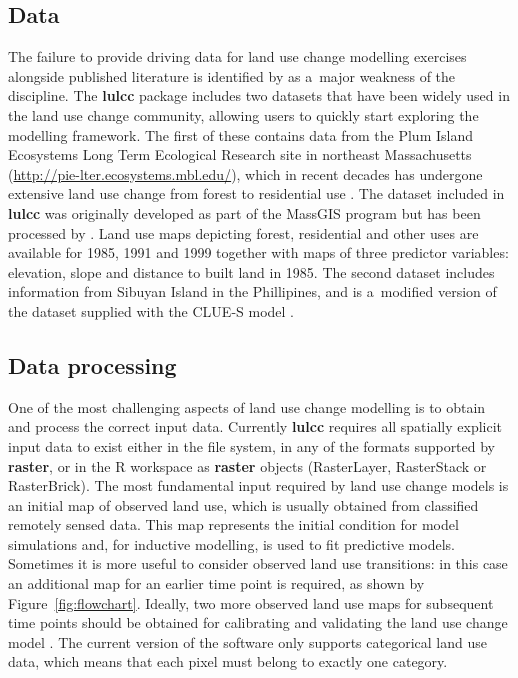 \documentclass{icldt}\usepackage[]{graphicx}\usepackage[]{color}
\begin{document}
\subsection{Data}

The failure to provide driving data for land use change modelling exercises alongside published literature is identified by \citet{rosa2014} as a~major weakness of the discipline. The \textbf{lulcc} package includes two datasets that have been widely used in the land use change community, allowing users to quickly start exploring the modelling framework. The first of these contains data from the Plum Island Ecosystems Long Term Ecological Research site in northeast Massachusetts (\url{http://pie-lter.ecosystems.mbl.edu/}), which in recent decades has undergone extensive land use change from forest to residential use \citep{aldwaik2012}. The dataset included in \textbf{lulcc} was originally developed as part of the MassGIS program \citep{massgis2015} but has been processed by \citet{pontius2014}. Land use maps depicting forest, residential and other uses are available for 1985, 1991 and 1999 together with maps of three predictor variables: elevation, slope and distance to built land in 1985. The second dataset includes information from Sibuyan Island in the Phillipines, and is a~modified version of the dataset supplied with the CLUE-S model \citep{verburg2002}.

\subsection{Data processing}

One of the most challenging aspects of land use change modelling is to obtain and process the correct input data. Currently \textbf{lulcc} requires all spatially explicit input data to exist either in the file system, in any of the formats supported by \textbf{raster}, or in the R workspace as \textbf{raster} objects (RasterLayer, RasterStack or RasterBrick). The most fundamental input required by land use change models is an initial map of observed land use, which is usually obtained from classified remotely sensed data. This map represents the initial condition for model simulations and, for inductive modelling, is used to fit predictive models. Sometimes it is more useful to consider observed land use transitions: in this case an additional map for an earlier time point is required, as shown by Figure~\ref{fig:flowchart}. Ideally, two more observed land use maps for subsequent time points should be obtained for calibrating and validating the land use change model \citep{pontius2004-a}. The current version of the software only supports categorical land use data, which means that each pixel must belong to exactly one category. \\
\end{document}
